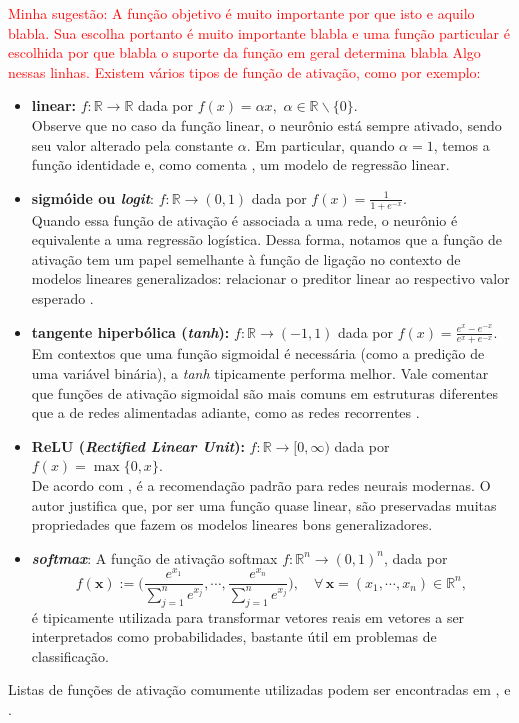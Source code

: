 \documentclass{automatextcc}
\newcommand{\pumi}[1]{\textcolor{red}{#1}}
\newcommand{\R}{\mathds{R}}
\newcommand{\bs}[1]{\boldsymbol{#1}}
\begin{document}
\pumi{Minha sugestão: A função objetivo é muito importante por que isto e aquilo blabla. Sua escolha portanto é muito importante blabla e uma função particular é escolhida por que blabla o suporte da função em geral determina blabla Algo nessas linhas. Existem vários tipos de função de ativação, como por exemplo:}
\begin{itemize}
    \item \textbf{linear:} $f: \R \rightarrow \R$ dada por $f(x) = \alpha x,$  $\alpha \in \R\backslash\{0\}$. \\
    Observe que no caso da função linear, o neurônio está sempre ativado, sendo seu valor alterado pela constante $\alpha$. Em particular, quando $\alpha=1$, temos a função identidade e, como comenta \citet{sarle1994}, um modelo de regressão linear.
    \item \textbf{sigmóide ou \textit{logit}}: $f: \R \rightarrow (0,1)$ dada por $f(x) = \frac{1}{1 + e^{-x}}$. \\
    Quando essa função de ativação é associada a uma rede, o neurônio é equivalente a uma regressão logística. Dessa forma, notamos que a função de ativação tem um papel semelhante à função de ligação no contexto de modelos lineares generalizados: relacionar o preditor linear ao respectivo valor esperado \citep{sarle1994,frei2020,mccullagh1989}.
    \item \textbf{tangente hiperbólica (\textit{tanh}):}  $f:\R \rightarrow (-1,1)$ dada por $f(x) = \frac{e^{x}-e^{-x}}{e^{x}+e^{-x}}$. \\
    Em contextos que uma função sigmoidal é necessária (como a predição de uma variável binária), a \textit{tanh} tipicamente performa melhor. Vale comentar que funções de ativação sigmoidal são mais comuns em estruturas diferentes que a de redes alimentadas adiante, como as redes recorrentes \citep{goodfellow2016}.  
    \item \textbf{ReLU (\textit{Rectified Linear Unit}):} $f: \R \rightarrow [0,\infty)$ dada por $f(x) = \max\{0,x\}$. \\
    De acordo com \citet{goodfellow2016}, é a recomendação padrão para redes neurais modernas. O autor justifica que, por ser uma função quase linear, são preservadas muitas propriedades que fazem os modelos lineares bons generalizadores. %
    \item \textbf{\textit{softmax}}: A função de ativação softmax $f:\R^n\rightarrow (0,1)^n$, dada por 
    \[f(\bs x):=\bigg(\frac{e^{x_1}}{\sum_{j=1}^n e^{x_j}},\cdots, \frac{e^{x_n}}{\sum_{j=1}^n e^{x_j}}\bigg), \quad \forall\,\bs x=(x_1,\cdots,x_n)\in\R^n,\]
    é tipicamente utilizada para transformar vetores reais em vetores a ser interpretados como probabilidades, bastante útil em problemas de classificação.
\end{itemize}
Listas de funções de ativação comumente utilizadas podem ser encontradas em \citet{hagan2014}, \citet{aggarwal2018} e \citet{dsa2022}.
\end{document}
